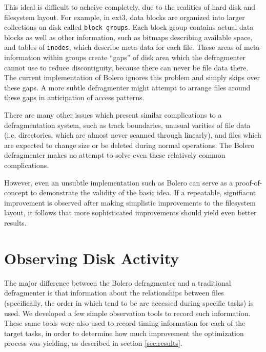 \documentclass[10pt,twocolumn,letterpaper]{article}
\begin{document}
This ideal is difficult to acheive completely, due to the realities of hard disk
and filesystem layout. For example, in ext3, data blocks are organized into larger
collections on disk called \texttt{block groups}\cite{ext2intro}. Each
block group contains actual data blocks as well as other information, such
as bitmaps describing available space, and tables of \texttt{inodes},
which describe meta-data for each file. These areas of meta-information within
groups create ``gaps'' of disk area which the defragmenter cannot
use to reduce discontiguity, because there can never be file data there.
The current implementation of Bolero ignores this problem and simply
skips over these gaps. A more subtle defragmenter might attempt to arrange
files around these gaps in anticipation of access patterns.

There are many other issues which present similar complications to a defragmentation
system, such as track boundaries, unusual varities of file data (i.e. directories, which
are almost never scanned through linearly), and files which are expected to change
size or be deleted during normal operations. The Bolero defragmenter makes no attempt to
solve even these relatively common complications.

However, even an unsubtle implementation such as Bolero can serve as a proof-of-concept
to demonstrate the validity of the basic idea. If a repeatable, signifiacnt improvement
is observed after making simplistic improvements to the filesystem layout, it follows
that more sophisticated improvements should yield even better results.

\section{Observing Disk Activity}\label{sec:observing}

The major difference between the Bolero defragmenter and a traditional defragmenter
is that information about the relationships between files (specifically, the order
in which tend to be are accessed during specific tasks) is used. We developed a few
simple observation tools to record such information. These same tools were also used to record
timing information for each of the target tasks, in order to determine how much improvement
the optimization process was yielding, as described in section \ref{sec:results}.
\end{document}
